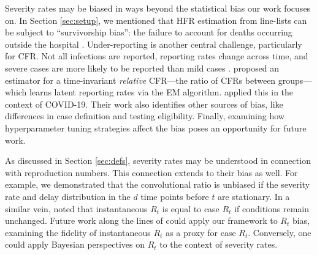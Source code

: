 \documentclass{article}
\begin{document}

Severity rates may be biased in ways beyond the statistical bias our work
focuses on. In Section \ref{sec:setup}, we mentioned that HFR estimation from
line-lists can be subject to ``survivorship bias'': the failure to account for 
deaths occurring outside the hospital \citep{lipsitch2015potential}.
Under-reporting is another central challenge, particularly for CFR. Not all
infections are reported, reporting rates change across time, and severe cases
are more likely to be reported than mild cases \citep{Tsang2021}. \citet{reich2012estimating}
proposed an estimator for a time-invariant \emph{relative} CFR---the ratio of
CFRs between groups---which learns latent reporting rates via the EM
algorithm. \citet{anastasios} applied this in the context of COVID-19. Their
work also identifies other sources of bias, like differences in case definition
and testing eligibility.  
Finally, examining how hyperparameter tuning strategies affect the bias poses an opportunity for future work.

As discussed in Section \ref{sec:defs}, severity rates may be understood in
connection with reproduction numbers. This connection extends to their bias as
well. For example, we  demonstrated that the convolutional ratio is unbiased if
the severity rate and delay distribution in the $d$ time points before $t$ are 
stationary. In a similar vein, \citet{fraser2007} noted that instantaneous $R_t$
is equal to case $R_t$ if conditions remain unchanged. Future work along the
lines of \citet{rt_study} could apply our framework to $R_t$ bias, examining the
fidelity of instantaneous $R_t$ as a proxy for case $R_t$.   
Conversely, one could apply Bayesian perspectives on $R_t$ to the context of severity rates.

\end{document}
